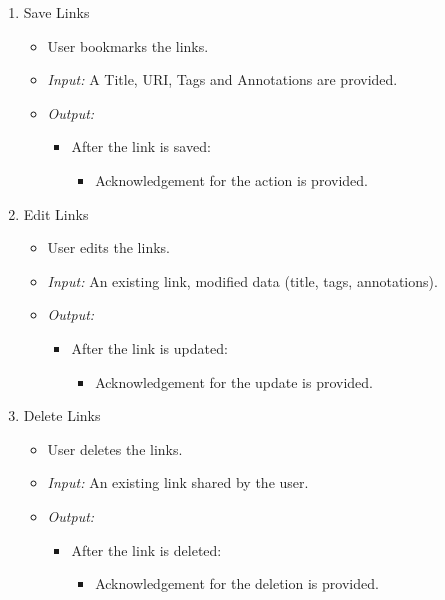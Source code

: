 \documentclass[11pt]{report} %
\begin{document}
\begin{enumerate}
	\item
		Save Links
		\begin{itemize}
			\item
				User bookmarks the links.
			\item
				\emph{Input:} A Title, URI, Tags and Annotations are provided.
			\item
				\emph{Output:} 
					\begin{itemize}
						\item				
							After the link is saved:
							\begin{itemize}
								\item
									Acknowledgement for the action is provided.
							\end{itemize}			
					\end{itemize}					
		\end{itemize}

	\item
		Edit  Links
		\begin{itemize}
			\item
				User edits the links.
			\item
				\emph{Input:} An existing link, modified data (title, tags, annotations).
			\item
				\emph{Output:} 
					\begin{itemize}
						\item	
							After the link is updated:
						\begin{itemize}
							\item
								Acknowledgement for the update is provided.
						\end{itemize}						
					\end{itemize}			
		\end{itemize}


	\item
		Delete   Links
		\begin{itemize}
			\item
				User deletes  the links.
			\item
				\emph{Input:} An existing link shared by the user.
			\item
				\emph{Output:} 
					\begin{itemize}
						\item	
							After the link is deleted:
						\begin{itemize}
							\item
								Acknowledgement for the deletion is provided.
						\end{itemize}			
					\end{itemize}
			\end{itemize}


\end{enumerate}
\end{document}
